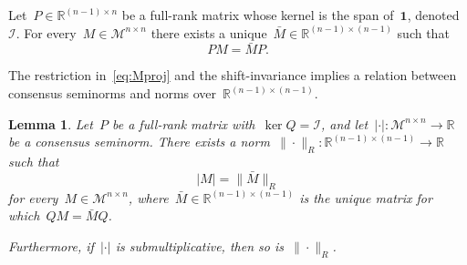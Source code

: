 \documentclass[letterpaper, 10 pt, conference]{ieeeconf}  %
\newtheorem{lemma}{Lemma}
\newcommand{\R}{\mathbb R}
\newcommand{\gensn}[1]{|#1|} %
\newcommand{\restnorm}[1]{\|#1\|_R} %
\newcommand{\consubsp}{\mathcal{I}} %
\newcommand{\eqrowsum}{\mathcal{M}} %
\begin{document}
Let~$P \in \R^{(n-1) \times n}$ be a full-rank matrix whose kernel is the span of~$\mathbf{1}$, denoted~$\consubsp$. For every~$M \in \eqrowsum^{n \times n}$ there exists a unique~$\bar M \in \R^{(n-1) \times (n-1)}$ such that
\begin{equation}\label{eq:Mproj}
    PM = \bar M P.
\end{equation}

The restriction in~\eqref{eq:Mproj} and the shift-invariance implies a relation between consensus seminorms and norms over~$\R^{(n-1) \times (n-1)}$.
\begin{lemma}\label{lem:restnorm}
    Let~$P$ be a full-rank matrix with~$\ker Q = \consubsp$, and let~$\gensn{\cdot} : \eqrowsum^{n \times n} \to \R$ be a consensus seminorm. There exists a norm~$\restnorm{\cdot} : \R^{(n-1) \times (n-1)} \to \R$ such that
    \begin{equation}
        \gensn{M} = \restnorm{\bar M}
    \end{equation}
    for every~$M \in \eqrowsum^{n \times n}$, where~$\bar M \in \R^{(n-1) \times (n-1)}$ is the unique matrix for which~$QM = \bar M Q$.

    Furthermore, if~$\gensn{\cdot}$ is submultiplicative, then so is~$\restnorm{\cdot}$.
\end{lemma}
\end{document}
